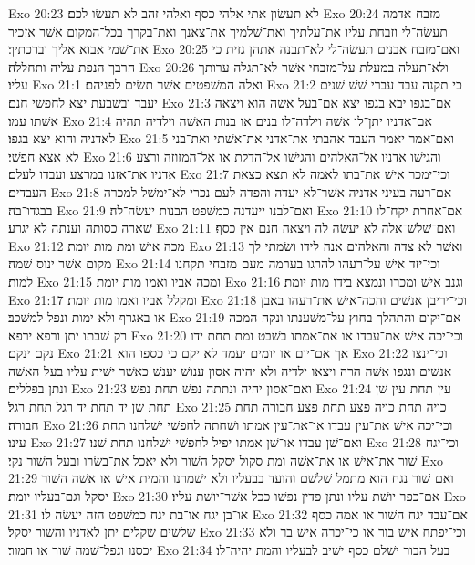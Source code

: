Exo 20:23  לא תעשׂון אתי אלהי כסף ואלהי זהב לא תעשׂו לכם׃
Exo 20:24  מזבח אדמה תעשׂה־לי וזבחת עליו את־עלתיך ואת־שׁלמיך את־צאנך ואת־בקרך בכל־המקום אשׁר אזכיר את־שׁמי אבוא אליך וברכתיך׃
Exo 20:25  ואם־מזבח אבנים תעשׂה־לי לא־תבנה אתהן גזית כי חרבך הנפת עליה ותחללה׃
Exo 20:26  ולא־תעלה במעלת על־מזבחי אשׁר לא־תגלה ערותך עליו׃
Exo 21:1  ואלה המשׁפטים אשׁר תשׂים לפניהם׃
Exo 21:2  כי תקנה עבד עברי שׁשׁ שׁנים יעבד ובשׁבעת יצא לחפשׁי חנם׃
Exo 21:3  אם־בגפו יבא בגפו יצא אם־בעל אשׁה הוא ויצאה אשׁתו עמו׃
Exo 21:4  אם־אדניו יתן־לו אשׁה וילדה־לו בנים או בנות האשׁה וילדיה תהיה לאדניה והוא יצא בגפו׃
Exo 21:5  ואם־אמר יאמר העבד אהבתי את־אדני את־אשׁתי ואת־בני לא אצא חפשׁי׃
Exo 21:6  והגישׁו אדניו אל־האלהים והגישׁו אל־הדלת או אל־המזוזה ורצע אדניו את־אזנו במרצע ועבדו לעלם׃
Exo 21:7  וכי־ימכר אישׁ את־בתו לאמה לא תצא כצאת העבדים׃
Exo 21:8  אם־רעה בעיני אדניה אשׁר־לא יעדה והפדה לעם נכרי לא־ימשׁל למכרה בבגדו־בה׃
Exo 21:9  ואם־לבנו ייעדנה כמשׁפט הבנות יעשׂה־לה׃
Exo 21:10  אם־אחרת יקח־לו שׁארה כסותה וענתה לא יגרע׃
Exo 21:11  ואם־שׁלשׁ־אלה לא יעשׂה לה ויצאה חנם אין כסף׃
Exo 21:12  מכה אישׁ ומת מות יומת׃
Exo 21:13  ואשׁר לא צדה והאלהים אנה לידו ושׂמתי לך מקום אשׁר ינוס שׁמה׃
Exo 21:14  וכי־יזד אישׁ על־רעהו להרגו בערמה מעם מזבחי תקחנו למות׃
Exo 21:15  ומכה אביו ואמו מות יומת׃
Exo 21:16  וגנב אישׁ ומכרו ונמצא בידו מות יומת׃
Exo 21:17  ומקלל אביו ואמו מות יומת׃
Exo 21:18  וכי־יריבן אנשׁים והכה־אישׁ את־רעהו באבן או באגרף ולא ימות ונפל למשׁכב׃
Exo 21:19  אם־יקום והתהלך בחוץ על־משׁענתו ונקה המכה רק שׁבתו יתן ורפא ירפא׃
Exo 21:20  וכי־יכה אישׁ את־עבדו או את־אמתו בשׁבט ומת תחת ידו נקם ינקם׃
Exo 21:21  אך אם־יום או יומים יעמד לא יקם כי כספו הוא׃
Exo 21:22  וכי־ינצו אנשׁים ונגפו אשׁה הרה ויצאו ילדיה ולא יהיה אסון ענושׁ יענשׁ כאשׁר ישׁית עליו בעל האשׁה ונתן בפללים׃
Exo 21:23  ואם־אסון יהיה ונתתה נפשׁ תחת נפשׁ׃
Exo 21:24  עין תחת עין שׁן תחת שׁן יד תחת יד רגל תחת רגל׃
Exo 21:25  כויה תחת כויה פצע תחת פצע חבורה תחת חבורה׃
Exo 21:26  וכי־יכה אישׁ את־עין עבדו או־את־עין אמתו ושׁחתה לחפשׁי ישׁלחנו תחת עינו׃
Exo 21:27  ואם־שׁן עבדו או־שׁן אמתו יפיל לחפשׁי ישׁלחנו תחת שׁנו׃
Exo 21:28  וכי־יגח שׁור את־אישׁ או את־אשׁה ומת סקול יסקל השׁור ולא יאכל את־בשׂרו ובעל השׁור נקי׃
Exo 21:29  ואם שׁור נגח הוא מתמל שׁלשׁם והועד בבעליו ולא ישׁמרנו והמית אישׁ או אשׁה השׁור יסקל וגם־בעליו יומת׃
Exo 21:30  אם־כפר יושׁת עליו ונתן פדין נפשׁו ככל אשׁר־יושׁת עליו׃
Exo 21:31  או־בן יגח או־בת יגח כמשׁפט הזה יעשׂה לו׃
Exo 21:32  אם־עבד יגח השׁור או אמה כסף שׁלשׁים שׁקלים יתן לאדניו והשׁור יסקל׃
Exo 21:33  וכי־יפתח אישׁ בור או כי־יכרה אישׁ בר ולא יכסנו ונפל־שׁמה שׁור או חמור׃
Exo 21:34  בעל הבור ישׁלם כסף ישׁיב לבעליו והמת יהיה־לו׃
